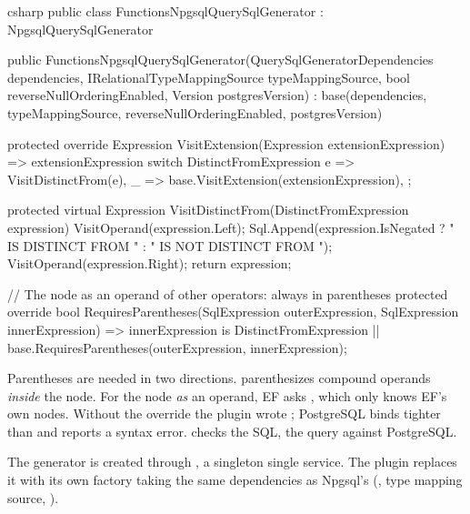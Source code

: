 \begin{sourcecode}{csharp}
public class FunctionsNpgsqlQuerySqlGenerator : NpgsqlQuerySqlGenerator
{
    public FunctionsNpgsqlQuerySqlGenerator(QuerySqlGeneratorDependencies dependencies,
        IRelationalTypeMappingSource typeMappingSource,
        bool reverseNullOrderingEnabled, Version postgresVersion)
        : base(dependencies, typeMappingSource, reverseNullOrderingEnabled, postgresVersion)
    {
    }

    protected override Expression VisitExtension(Expression extensionExpression)
        => extensionExpression switch
        {
            DistinctFromExpression e => VisitDistinctFrom(e),
            _ => base.VisitExtension(extensionExpression),
        };

    protected virtual Expression VisitDistinctFrom(DistinctFromExpression expression)
    {
        VisitOperand(expression.Left);
        Sql.Append(expression.IsNegated ? " IS DISTINCT FROM " : " IS NOT DISTINCT FROM ");
        VisitOperand(expression.Right);
        return expression;
    }

    // The node as an operand of other operators: always in parentheses
    protected override bool RequiresParentheses(SqlExpression outerExpression,
        SqlExpression innerExpression)
        => innerExpression is DistinctFromExpression
           || base.RequiresParentheses(outerExpression, innerExpression);
}
\end{sourcecode}

Parentheses are needed in two directions.  parenthesizes
compound operands \emph{inside} the node. For the node \emph{as} an operand, EF asks
, which only knows EF's own nodes. Without the override
the plugin wrote ; PostgreSQL binds
\code{<>} tighter than  and reports a syntax error.
 checks the SQL,
 the query against PostgreSQL.

The generator is created through
, a singleton single
service. The plugin replaces it with its own factory taking the same dependencies as
Npgsql's (, type
mapping source, ).

